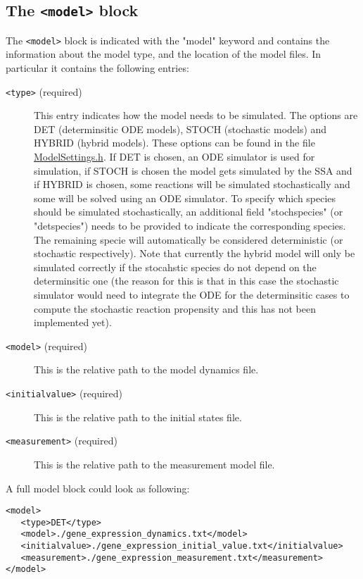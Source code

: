 \documentclass[11pt]{article} %
\begin{document}
\subsection{The \texttt{<model>} block}
The \texttt{<model>} block is indicated with the "model" keyword and contains the information about the model type, and the location of the model files. In particular it contains the following entries: 
\begin{description}
\item[\texttt{<type>} (required)] This entry indicates how the model needs to be simulated. The options are DET (determinsitic ODE models), STOCH (stochastic models) and HYBRID (hybrid models). These options can be found in the file \href{https://github.com/Mijan/LFNS/blob/publishable/src/models/ModelSettings.h}{ModelSettings.h}. If DET is chosen, an ODE simulator is used for simulation, if STOCH is chosen the model gets simulated by the SSA and if HYBRID is chosen, some reactions will be simulated stochastically and some will be solved using an ODE simulator. To specify which species should be simulated stochastically, an additional field "stochspecies" (or "detspecies") needs to be provided to indicate the corresponding species. The remaining specie will automatically be considered deterministic (or stochastic respectively). Note that currently the hybrid model will only be simulated correctly if the stocahstic species do not depend on the determinsitic one (the reason for this is that in this case the stochastic simulator would need to integrate the ODE for the determinsitic cases to compute the stochastic reaction propensity and this has not been implemented yet). 
\item[\texttt{<model>} (required)] This is the relative path to the model dynamics file. 
\item[\texttt{<initialvalue>} (required)]This is the relative path to the initial states file.
\item[\texttt{<measurement>} (required)] This is the relative path to the measurement model file. 
\end{description}
A full model block could look as following:


\begin{tcolorbox}
\begin{verbatim}
<model>
   <type>DET</type>
   <model>./gene_expression_dynamics.txt</model>
   <initialvalue>./gene_expression_initial_value.txt</initialvalue>
   <measurement>./gene_expression_measurement.txt</measurement>
</model>
\end{verbatim}
\end{tcolorbox}
\end{document}
